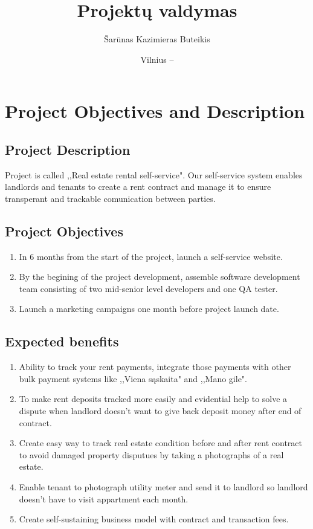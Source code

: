 \documentclass{VUMIFPSkursinis}
\title{Projektų valdymas}
\author{Šarūnas Kazimieras Buteikis}
\date{Vilnius – \the\year}
\begin{document}
\maketitle

\tableofcontents

\section{Project Objectives and Description}
	\subsection{Project Description}
		Project is called ,,Real estate rental self-service". 
		Our self-service system enables landlords and tenants to create a rent contract and manage it to ensure transperant and trackable comunication between parties.

	\subsection{Project Objectives}
		\begin{enumerate}
			\item{In 6 months from the start of the project, launch a self-service website.}
			\item{By the begining of the project development, assemble software development team consisting of two mid-senior level developers and one QA tester.}
			\item{Launch a marketing campaigns one month before project launch date.}
		\end{enumerate}

	\subsection{Expected benefits}
		\begin{enumerate}
			\item{Ability to track your rent payments, integrate those payments with other bulk payment systems like ,,Viena sąskaita" and ,,Mano gile".}
			\item{To make rent deposits tracked more easily and evidential help to solve a dispute when landlord doesn't want to give back deposit money after end of contract.}
			\item{Create easy way to track real estate condition before and after rent contract to avoid damaged property disputues by taking a photographs of a real estate.}
			\item{Enable tenant to photograph utility meter and send it to landlord so landlord doesn't have to visit appartment each month.}
			\item{Create self-sustaining business model with contract and transaction fees.}
		\end{enumerate}
\end{document}
